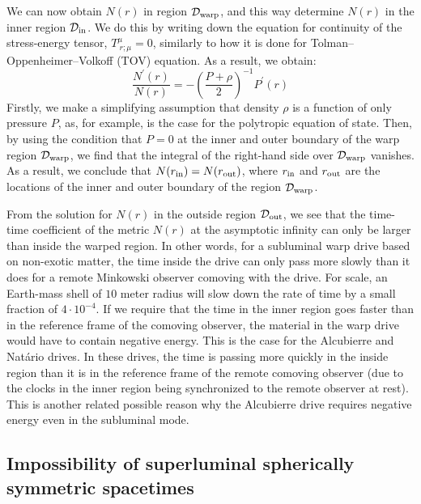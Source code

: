 \documentclass[10pt]{iopart}
\begin{document}
We can now obtain $N(r)$ in region $\mathcal{D}_{\rm warp}$, and this way determine $N(r)$ in the inner region $\mathcal{D}_{\rm in}$. We do this by writing down the equation for continuity of the stress-energy tensor, $T^{\mu}_{~r;\mu}=0$, similarly to how it is done for Tolman–Oppenheimer–Volkoff (TOV) equation. As a result, we obtain:
\begin{equation}
    \frac{N^\prime(r)}{N(r)}=-\left(\frac{P+\rho}{2}\right)^{-1}P^\prime(r)
    \label{eq:Sph4}
\end{equation}
{ Firstly, we make a simplifying assumption that density $\rho$ is a function of only pressure $P$, as, for example, is the case for the polytropic equation of state. Then, by using the condition that $P=0$ at the inner and outer boundary of the warp region $\mathcal{D}_{\rm warp}$, we find that the integral of the right-hand side over $\mathcal{D}_{\rm warp}$ vanishes. As a result, we conclude that $N(r_{\rm in})=N(r_{\rm out})$, where $r_{\rm in}$ and $r_{\rm out}$ are the locations of the inner and outer boundary of the region $\mathcal{D}_{\rm warp}$.}


From the solution for $N(r)$ in the outside region $\mathcal{D}_{\rm out}$, we see that the time-time coefficient of the metric $N(r)$ at the asymptotic infinity can only be larger than inside the warped region. In other words, for a subluminal warp drive based on non-exotic matter, the time inside the drive can only pass more slowly than it does for a remote Minkowski observer comoving with the drive. For scale, an Earth-mass shell of $10$ meter radius will slow down the rate of time by a small fraction of $4\cdot 10^{-4}$. If we require that the time in the inner region goes faster than in the reference frame of the comoving observer, the material in the warp drive would have to contain negative energy. This is the case for the Alcubierre and Natário drives. In these drives, the time is passing more quickly in the inside region than it is in the reference frame of the remote comoving observer (due to the clocks in the inner region being synchronized to the remote observer at rest). This is another related possible reason why the Alcubierre drive requires negative energy even in the subluminal mode.




\subsection{Impossibility of superluminal spherically symmetric spacetimes}
\end{document}
